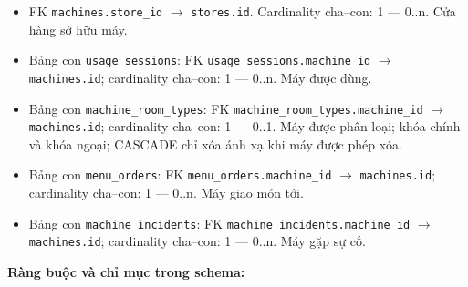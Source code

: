 \begin{itemize}

\item FK \texttt{machines.store\_id} $\rightarrow$ \texttt{stores.id}. Cardinality cha--con: 1 — 0..n. Cửa hàng sở hữu máy.

\item Bảng con \texttt{usage\_sessions}: FK \texttt{usage\_sessions.machine\_id} $\rightarrow$ \texttt{machines.id}; cardinality cha--con: 1 — 0..n. Máy được dùng.

\item Bảng con \texttt{machine\_room\_types}: FK \texttt{machine\_room\_types.machine\_id} $\rightarrow$ \texttt{machines.id}; cardinality cha--con: 1 — 0..1. Máy được phân loại; khóa chính và khóa ngoại; CASCADE chỉ xóa ánh xạ khi máy được phép xóa.

\item Bảng con \texttt{menu\_orders}: FK \texttt{menu\_orders.machine\_id} $\rightarrow$ \texttt{machines.id}; cardinality cha--con: 1 — 0..n. Máy giao món tới.

\item Bảng con \texttt{machine\_incidents}: FK \texttt{machine\_incidents.machine\_id} $\rightarrow$ \texttt{machines.id}; cardinality cha--con: 1 — 0..n. Máy gặp sự cố.

\end{itemize}

\textbf{Ràng buộc và chỉ mục trong schema:}

